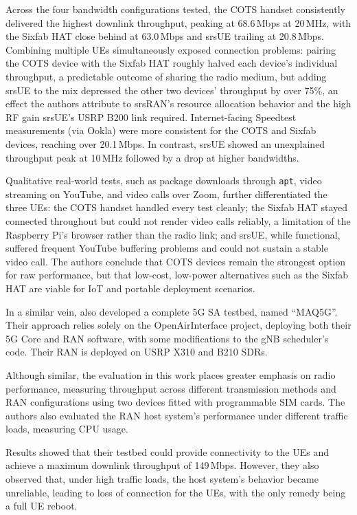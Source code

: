 Across the four bandwidth configurations tested, the \gls{COTS} handset consistently delivered the highest downlink throughput, peaking at 68.6\,Mbps at 20\,MHz, with the Sixfab HAT close behind at 63.0\,Mbps and srsUE trailing at 20.8\,Mbps. Combining multiple \glspl{UE} simultaneously exposed connection problems: pairing the \gls{COTS} device with the Sixfab HAT roughly halved each device's individual throughput, a predictable outcome of sharing the radio medium, but adding srsUE to the mix depressed the other two devices' throughput by over 75\%, an effect the authors attribute to srsRAN's resource allocation behavior and the high \gls{RF} gain srsUE's USRP B200 link required. Internet-facing Speedtest measurements (via Ookla) were more consistent for the \gls{COTS} and Sixfab devices, reaching over 20.1\,Mbps. In contrast, srsUE showed an unexplained throughput peak at 10\,MHz followed by a drop at higher bandwidths.

Qualitative real-world tests, such as package downloads through \texttt{apt}, video streaming on YouTube, and video calls over Zoom, further differentiated the three \glspl{UE}: the \gls{COTS} handset handled every test cleanly; the Sixfab HAT stayed connected throughout but could not render video calls reliably, a limitation of the Raspberry Pi's browser rather than the radio link; and srsUE, while functional, suffered frequent YouTube buffering problems and could not sustain a stable video call. The authors conclude that \gls{COTS} devices remain the strongest option for raw performance, but that low-cost, low-power alternatives such as the Sixfab HAT are viable for \gls{IoT} and portable deployment scenarios.

In a similar vein, \textcite{vazquez2024maq5g} also developed a complete 5G \gls{SA} testbed, named ``MAQ5G''. Their approach relies solely on the OpenAirInterface project, deploying both their 5G Core and \gls{RAN} software, with some modifications to the \gls{gNB} scheduler's code. Their \gls{RAN} is deployed on USRP X310 and B210 \glspl{SDR}.

Although similar, the evaluation in this work places greater emphasis on radio performance, measuring throughput across different transmission methods and \gls{RAN} configurations using two  devices fitted with programmable SIM cards. The authors also evaluated the \gls{RAN} host system's performance under different traffic loads, measuring CPU usage.

Results showed that their testbed could provide connectivity to the \glspl{UE} and achieve a maximum downlink throughput of 149\,Mbps. However, they also observed that, under high traffic loads, the host system's behavior became unreliable, leading to loss of connection for the \glspl{UE}, with the only remedy being a full \gls{UE} reboot.

